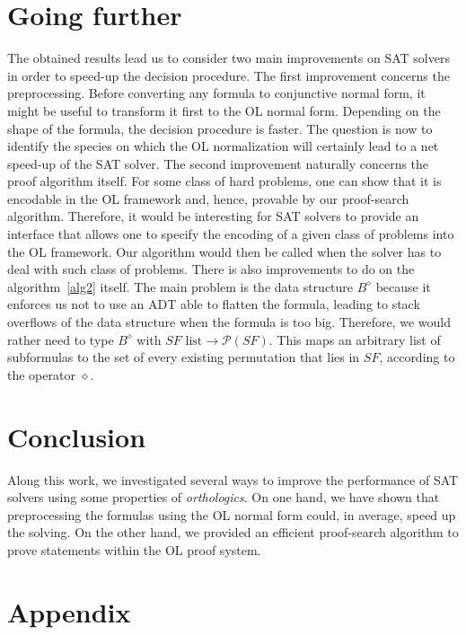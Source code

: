 \documentclass[a4paper, 11pt]{article}
\begin{document}
    \section{Going further}
    The obtained results lead us to consider two main improvements on SAT solvers in order to speed-up 
    the decision procedure. The first improvement concerns the preprocessing. Before converting any 
    formula to
    conjunctive normal form, it might be useful to transform it first to the OL normal form. Depending
    on the shape of the formula, the decision procedure is faster. The question is now to identify the
    species on which the OL normalization will certainly lead to a net speed-up of the SAT solver. 
    The second improvement naturally 
    concerns the proof algorithm itself. For some class of hard problems, one can show that it is
    encodable in the OL framework and, hence, provable by our proof-search algorithm. Therefore, it
    would be interesting for SAT solvers to provide an interface that allows one to specify the
    encoding of a given class of problems into the OL framework. Our algorithm would then be called
    when the solver has to deal with such class of problems. There is also improvements to do on the
    algorithm~\ref{alg2} itself. The main problem is the data structure $B^\diamond$ because it enforces
    us not to use an ADT able to flatten the formula, leading to stack overflows of the data structure
    when the formula is too big. Therefore, we would rather need to type $B^\diamond$ with 
    $SF\text{ list}\rightarrow\mathcal{P}(SF)$. This maps an arbitrary list of subformulas to
    the set of every existing permutation that lies in $SF$, according to the operator $\diamond$.
    \section{Conclusion} 
    Along this work, we investigated several ways to improve the performance of SAT solvers using
    some properties of \textit{orthologics}. On one hand, we have shown that preprocessing the formulas 
    using the OL normal form could, in average, speed up the solving. On the other hand, we provided an
    efficient proof-search algorithm to prove statements within the OL proof system.
    \section{Appendix}
    
    
\end{document}
